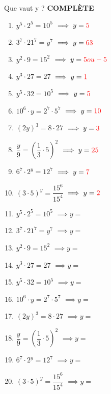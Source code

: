 \question%
Que vaut y ? \textbf{COMPLÈTE}

\begin{multicols}{2}
\begin{enumerate}[label=\alph*)]
\ifdefined\withanswers %
	\item \( y^5 \cdot 2^5 = 10^5 \) \(\implies  y = \color{red}{ 5} \)
	\item \( 3^7 \cdot 21^7 = y^7 \) \(\implies  y = \color{red}{ 63} \)
	\item \( y^2 \cdot 9 = 15^2 \) \(\implies  y = \color{red}{ 5 ou -5} \)
	\item \( y^3 \cdot 27 = 27 \) \(\implies  y = \color{red}{ 1} \)
	\item \( y^5 \cdot 32 = 10^5 \) \(\implies  y = \color{red}{ 5 } \)
	\item \( 10^6 \cdot y = 2^7 \cdot 5^7 \) \(\implies  y = \color{red}{ 10} \)
	\item \( \left(2y\right)^3 = 8 \cdot 27 \) \(\implies  y = \color{red}{ 3} \)
	\item \( \dfrac{y}{9} = \left(\dfrac{1}{3} \cdot 5\right)^2 \) \(\implies  y = \color{red}{ 25} \)
	\item \( 6^7 \cdot 2^y = 12^7 \) \(\implies  y = \color{red}{ 7} \)
	\item \( \left(3 \cdot 5\right)^y = \dfrac{15^6}{15^4} \) \(\implies  y = \color{red}{ 2 } \)
\else
	\item \( y^5 \cdot 2^5 = 10^5 \) \(\implies y = \)
	\item \( 3^7 \cdot 21^7 = y^7 \) \(\implies y = \)
	\item \( y^2 \cdot 9 = 15^2 \) \(\implies y = \)
	\item \( y^3 \cdot 27 = 27 \) \(\implies y = \)
	\item \( y^5 \cdot 32 = 10^5 \) \(\implies y = \)
	\item \( 10^6 \cdot y = 2^7 \cdot 5^7 \) \(\implies y = \)
	\item \( \left(2y\right)^3 = 8 \cdot 27 \) \(\implies y = \)
	\item \( \dfrac{y}{9} = \left(\dfrac{1}{3} \cdot 5\right)^2 \) \(\implies y = \)
	\item \( 6^7 \cdot 2^y = 12^7 \) \(\implies y = \)
	\item \( \left(3 \cdot 5\right)^y = \dfrac{15^6}{15^4} \) \(\implies y = \)

\fi
\end{enumerate}
\end{multicols}
